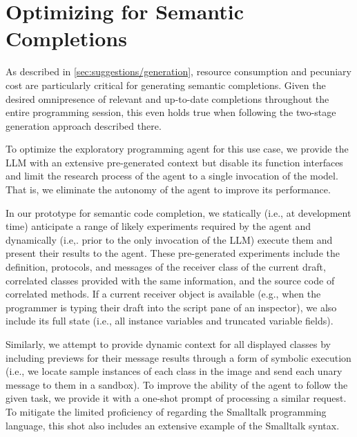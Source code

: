 
\section{Optimizing for Semantic Completions}
\label{sec:agent/completions}

As described in \cref{sec:suggestions/generation}, resource consumption and pecuniary cost are particularly critical for generating semantic completions.
Given the desired omnipresence of relevant and up-to-date completions throughout the entire programming session, this even holds true when following the two-stage generation approach described there.

To optimize the exploratory programming agent for this use case, we provide the LLM with an extensive pre-generated context but disable its function interfaces and limit the research process of the agent to a single invocation of the model.
That is, we eliminate the autonomy of the agent to improve its performance. %

In our prototype for semantic code completion, we statically (i.e., at development time) anticipate a range of likely experiments required by the agent and dynamically (i.e,. prior to the only invocation of the LLM) execute them and present their results to the agent.
These pre-generated experiments include the definition, protocols, and messages of the receiver class of the current draft, correlated classes provided with the same information, and the source code of correlated methods.
If a current receiver object is available (e.g., when the programmer is typing their draft into the script pane of an inspector), we also include its full state (i.e., all instance variables and truncated variable fields).

Similarly, we attempt to provide dynamic context for all displayed classes by including previews for their message results through a form of symbolic execution (i.e., we locate sample instances of each class in the image and send each unary message to them in a sandbox). %
To improve the ability of the agent to follow the given task, we provide it with a one-shot prompt of processing a similar request.
To mitigate the limited proficiency of \gptfouro regarding the Smalltalk programming language, this shot also includes an extensive example of the Smalltalk syntax.

